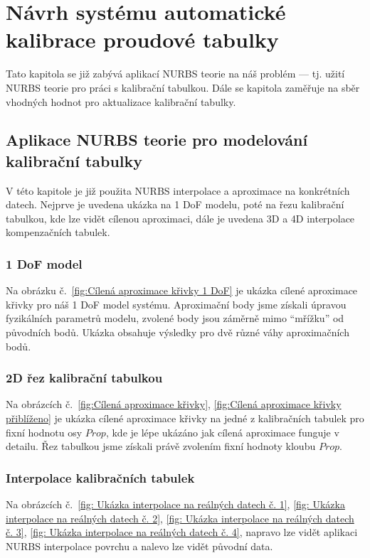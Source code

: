 \section{Návrh systému automatické kalibrace proudové tabulky}\label{section: návrh automatické kalibraci}
Tato kapitola se již zabývá aplikací NURBS teorie na náš problém --- tj. užití NURBS teorie pro práci s kalibrační tabulkou. Dále se kapitola zaměřuje na sběr vhodných hodnot pro aktualizace kalibrační tabulky.
\subsection{Aplikace NURBS teorie pro modelování kalibrační tabulky}
V této kapitole je již použita NURBS interpolace a aproximace na konkrétních datech. Nejprve je uvedena ukázka na 1 DoF modelu, poté na řezu kalibrační tabulkou, kde lze vidět cílenou aproximaci, dále je uvedena 3D a 4D interpolace kompenzačních tabulek.
\subsubsection{1 DoF model}
Na obrázku č.~\ref{fig:Cílená aproximace křivky 1 DoF} je ukázka cílené aproximace křivky pro náš 1 DoF model systému. Aproximační body jsme získali úpravou fyzikálních parametrů modelu, zvolené body jsou záměrně mimo ``mřížku'' od původních bodů. Ukázka obsahuje výsledky pro dvě různé váhy aproximačních bodů.
\subsubsection{2D řez kalibrační tabulkou}
Na obrázcích č.~\ref{fig:Cílená aproximace křivky}, \ref{fig:Cílená aproximace křivky přiblíženo} je ukázka
cílené aproximace křivky na jedné z kalibračních tabulek pro fixní hodnotu osy $Prop$, kde je lépe ukázáno jak cílená aproximace funguje v detailu. Řez tabulkou jsme získali právě zvolením fixní hodnoty kloubu $Prop$.
\subsubsection{Interpolace kalibračních tabulek}
Na obrázcích č.~\ref{fig: Ukázka interpolace na reálných datech č. 1}, \ref{fig: Ukázka interpolace na reálných datech č. 2}, \ref{fig: Ukázka interpolace na reálných datech č. 3}, \ref{fig: Ukázka interpolace na reálných datech č. 4}, napravo lze vidět aplikaci NURBS interpolace povrchu a nalevo lze vidět původní data.
